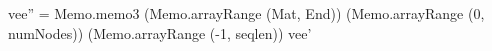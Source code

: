 vee'' = Memo.memo3 (Memo.arrayRange (Mat, End)) 
                   (Memo.arrayRange (0, numNodes))
                   (Memo.arrayRange (-1, seqlen)) 
                   vee'

